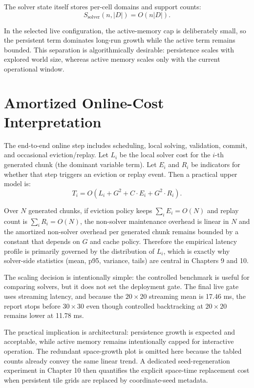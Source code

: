 \documentclass[12pt,a4paper]{report}
\begin{document}
The solver state itself stores per-cell domains and support counts:
\[
S_{\text{solver}}(n, |D|) = O(n|D|).
\]

In the selected live configuration, the active-memory cap is deliberately small, so the persistent term dominates long-run growth while the active term remains bounded. This separation is algorithmically desirable: persistence scales with explored world size, whereas active memory scales only with the current operational window.

\section{Amortized Online-Cost Interpretation}
The end-to-end online step includes scheduling, local solving, validation, commit, and occasional eviction/replay. Let $L_i$ be the local solver cost for the $i$-th generated chunk (the dominant variable term). Let $E_i$ and $R_i$ be indicators for whether that step triggers an eviction or replay event. Then a practical upper model is:
\[
T_i = O(L_i + G^2 + C\cdot E_i + G^2\cdot R_i).
\]

Over $N$ generated chunks, if eviction policy keeps $\sum_i E_i = O(N)$ and replay count is $\sum_i R_i = O(N)$, the non-solver maintenance overhead is linear in $N$ and the amortized non-solver overhead per generated chunk remains bounded by a constant that depends on $G$ and cache policy. Therefore the empirical latency profile is primarily governed by the distribution of $L_i$, which is exactly why solver-side statistics (mean, p95, variance, tails) are central in Chapters 9 and 10.

The scaling decision is intentionally simple: the controlled benchmark is useful for comparing solvers, but it does not set the deployment gate. The final live gate uses streaming latency, and because the $20\times20$ streaming mean is 17.46 ms, the report stops before $30\times30$ even though controlled backtracking at $20\times20$ remains lower at 11.78 ms.

The practical implication is architectural: persistence growth is expected and acceptable, while active memory remains intentionally capped for interactive operation. The redundant space-growth plot is omitted here because the tabled counts already convey the same linear trend. A dedicated seed-regeneration experiment in Chapter 10 then quantifies the explicit space-time replacement cost when persistent tile grids are replaced by coordinate-seed metadata.
\end{document}
